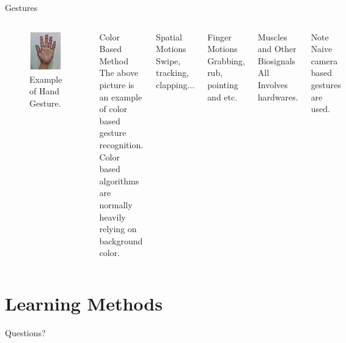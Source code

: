 \documentclass[10pt]{beamer}
\begin{document}
\begin{frame}[fragile]{Gestures}
  \begin{columns}[T,onlytextwidth]
    \begin{figure}[!ht]
      \centering
      \includegraphics[width=3cm]{ges.jpg}
      \caption{\scriptsize{} Example of Hand Gesture.}
      \label{fig:gesture}
    \end{figure}
    \begin{block}{Color Based Method}
      \scriptsize
      The above picture is an example of color based gesture
      recognition. Color based algorithms are normally heavily relying
      on background color. 
    \end{block}

    
    \vspace{8mm}
    \begin{block}{Spatial Motions}
      Swipe, tracking, clapping...
    \end{block}

    \begin{block}{Finger Motions}
      Grabbing, rub, pointing and etc.
    \end{block}

    \begin{block}{Muscles and Other Biosignals}
      All Involves hardwares.
    \end{block}

    \begin{alertblock}{Note}
      Naive camera based gestures are used.  
    \end{alertblock}
  \end{columns}
\end{frame}





\section{Learning Methods}



\begin{frame}[standout]
  Questions?
\end{frame}
\end{document}
